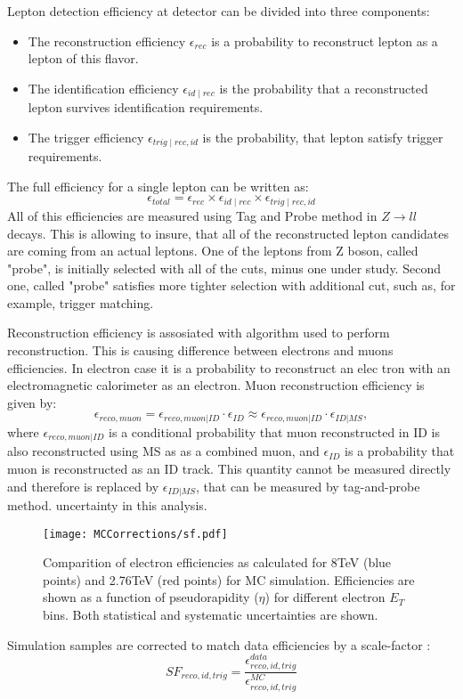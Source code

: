 Lepton detection efficiency at \atlas detector can be divided into three components:
\begin{itemize}
\item The reconstruction efficiency $\epsilon_{rec}$ is a probability to reconstruct lepton as a lepton of this flavor.
\item The identification efficiency $\epsilon_{id \mid rec}$ is the probability that a reconstructed lepton survives  identification requirements. 
\item The trigger efficiency $\epsilon_{trig \mid rec,id}$ is the probability, that lepton satisfy trigger requirements. 
\end{itemize}
The full efficiency for a single lepton can be written as:
\begin{equation}
\epsilon_{total}=\epsilon_{rec} \times \epsilon_{id \mid rec} \times \epsilon_{trig \mid rec,id}
\end{equation}
All of this efficiencies are measured using Tag and Probe method in $Z\to ll$ decays. This is allowing to insure, that all of the reconstructed lepton candidates are coming from an actual leptons. One of the leptons from Z boson, called "probe", is initially selected with all of the cuts, minus one under study. Second one, called "probe" satisfies more tighter selection with additional cut, such as, for example, trigger matching.

Reconstruction efficiency is assosiated with algorithm used to perform reconstruction. This is causing difference between electrons and muons efficiencies. In electron case it is a probability to reconstruct an elec tron with an electromagnetic calorimeter as an electron.  Muon reconstruction efficiency is given by:
\begin{equation}
\epsilon_{reco,muon} = \epsilon_{reco,muon|ID} \cdot \epsilon_{ID} \approx \epsilon_{reco,muon|ID} \cdot \epsilon_{ID|MS},
\end{equation}
where $\epsilon_{reco,muon|ID}$ is a conditional probability that muon reconstructed in ID is also reconstructed using MS as as a combined muon, and  $\epsilon_{ID}$ is a probability that muon is reconstructed as an ID track. This quantity cannot be measured directly and therefore is replaced by $\epsilon_{ID|MS}$, that can be measured by tag-and-probe method. 
uncertainty in this analysis. 

\begin{figure}[t]
\centering
\texttt{[image: MCCorrections/sf.pdf]}
\caption{Comparition of electron efficiencies as calculated for 8TeV (blue points) and 2.76TeV (red points) for MC simulation. Efficiencies are shown as a function of pseudorapidity ($\eta$) for different electron $E_T$ bins. Both statistical and systematic uncertainties are shown. }
\label{eff_comp}
\end{figure}
Simulation samples are corrected to match data efficiencies by a scale-factor :
\begin{equation}
SF_{reco,id,trig}=\frac{\epsilon^{data}_{reco,id,trig}}{\epsilon^{MC}_{reco,id,trig}}
\end{equation}

